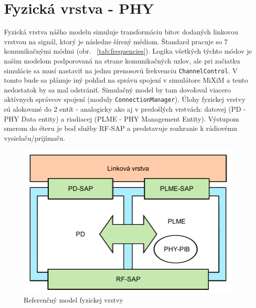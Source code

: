 \section{Fyzická vrstva - PHY}
\indent\indent Fyzická vrstva nášho modelu simuluje transformáciu bitov dodaných linkovou vrstvou na signál, ktorý je následne šírený médiom. Štandard pracuje so 7 komunikačnými módmi (obr. ~\ref{tab:frequencies}). Logika všetkých týchto módov je našim modelom podporovaná na strane komunikačných uzlov, ale pri začiatku simulácie sa musí nastaviť na jednu prenosovú frekvenciu \texttt{ChannelControl}. V tomto bude sa plánuje iný pohľad na správu spojení v simulátore MiXiM a tento nedostatok by sa mal odstrániť. Simulačný model by tam dovoľoval viacero aktívnych správcov spojení (moduly \texttt{ConnectionManager}). Úlohy fyzickej vrstvy sú alokované do 2 entít - analogicky ako aj v predošlých vrstvách: datovej (PD - PHY Data entity) a riadiacej (PLME - PHY Management Entity). Výs\-tupom smerom do éteru je bod služby RF-SAP a predstavuje rozhranie k rádiovému vysielaču/prijímaču.\\
\begin{figure}[htbp]
\begin{center}
\includegraphics[width=120mm]{figures/topology_phy}
\caption{Referenčný model fyzickej vrstvy}
\label{fig:topology_phy}
\end{center}
\end{figure}
